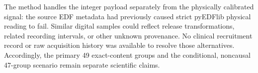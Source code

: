 The method handles the integer payload separately
from the physically calibrated signal: the source EDF
metadata had previously caused strict pyEDFlib physical
reading to fail. Similar digital samples could reflect
release transformations, related recording intervals,
or other unknown provenance. No clinical recruitment
record or raw acquisition history was available to
resolve those alternatives. Accordingly, the primary
49 exact-content groups and the conditional, noncausal
47-group scenario remain separate scientific claims.
